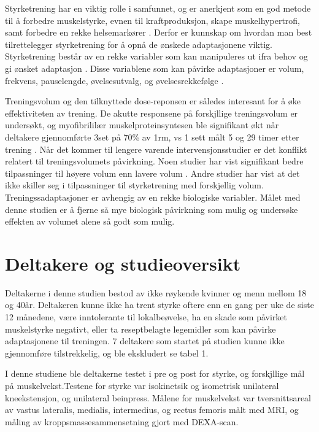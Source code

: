 \documentclass[
]{book}
\begin{document}
Styrketrening har en viktig rolle i samfunnet, og er anerkjent som en god metode til å forbedre muskelstyrke, evnen til kraftproduksjon, skape muskelhypertrofi, samt forbedre en rekke helsemarkører \citep{kraemer2002}. Derfor er kunnskap om hvordan man best tilrettelegger styrketrening for å opnå de ønskede adaptasjonene viktig. Styrketrening består av en rekke variabler som kan manipuleres ut ifra behov og gi ønsket adaptasjon \citep{kraemer2004, bird2005}. Disse variablene som kan påvirke adaptasjoner er volum, frekvens, pauselengde, øvelsesutvalg, og øvelsesrekkefølge \citep{American2009}.

Treningsvolum og den tilknyttede dose-reponsen er således interesant for å øke effektiviteten av trening. De akutte responsene på forskjllige treningsvolum er undersøkt, og myofibrililær muskelproteinsyntesen ble signifikant økt når deltakere gjennomførte 3set på 70\% av 1rm, vs 1 sett målt 5 og 29 timer etter trening \citep{burd2010}. Når det kommer til lengere varende intervensjonsstudier er det konflikt relatert til treningsvolumets påvirkning. Noen studier har vist signifikant bedre tilpassninger til høyere volum enn lavere volum \citep[ ]{rønnestad2007, starkey1996, radaelli2015}. Andre studier har vist at det ikke skiller seg i tilpassninger til styrketrening med forskjellig volum\citep{bottaro2011, galvao2005, mcbride2003}. Treningssadaptasjoner er avhengig av en rekke biologiske variabler. Målet med denne studien er å fjerne så mye biologisk påvirkning som mulig og undersøke effekten av volumet alene så godt som mulig.

\hypertarget{deltakere-og-studieoversikt}{%
\section{Deltakere og studieoversikt}\label{deltakere-og-studieoversikt}}

Deltakerne i denne studien bestod av ikke røykende kvinner og menn mellom 18 og 40år. Deltakeren kunne ikke ha trent styrke oftere enn en gang per uke de siste 12 månedene, være inntolerante til lokalbeøvelse, ha en skade som påvirket muskelstyrke negativt, eller ta reseptbelagte legemidler som kan påvirke adaptasjonene til treningen. 7 deltakere som startet på studien kunne ikke gjennomføre tilstrekkelig, og ble ekskludert se tabel 1.

I denne studiene ble deltakerne testet i pre og post for styrke, og forskjllige mål på muskelvekst.Testene for styrke var isokinetsik og isometrisk unilateral kneekstensjon, og unilateral beinpress. Målene for muskelvekst var tversnittsareal av vastus lateralis, medialis, intermedius, og rectus femoris målt med MRI, og måling av kroppsmassesammensetning gjort med DEXA-scan.
\end{document}
